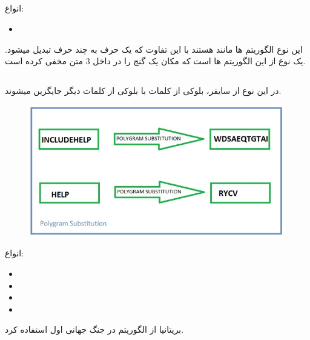 \subsection{}
انواع:
\begin{itemize}
    \item   
\end{itemize}
این نوع الگوریتم ها مانند 
هستند با این تفاوت که یک حرف به چند حرف تبدیل میشود.
یک نوع از این الگوریتم ها است که مکان یک گنج را در داخل 3 متن مخفی کرده است.

\subsection{}
در این نوع از سایفر، بلوکی از کلمات با بلوکی از کلمات دیگر جایگزین میشوند.
\begin{figure}[H]
    \centering
    \includegraphics[width=0.5\linewidth]{images/substitution.jpg}
    \caption{}
    \label{fig:Polygram}
\end{figure}
انواع:
\begin{itemize}
    \item   
    \item
    \item
    \item
\end{itemize}
بریتانیا از الگوریتم 
در جنگ جهانی اول استفاده کرد.

